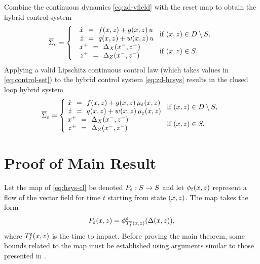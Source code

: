 Combine the continuous dynamics \eqref{eq:zd-vfield} with the reset map to obtain the hybrid control system
%
\begin{align}
  \label{eq:zd-hcsys}
  \HCSbar= \left\{
  \begin{array}{l l}
    \begin{array}{r c l}
      {\dot \zdx} &\!\!=\!\!& f\argsxz + g\argsxz \, u\\
      {\dot \zdz} &\!\!=\!\!& q\argsxz + w\argsxz \, u
    \end{array} \!\! & \!\! \mbox{if } \argsxz \in \D \setminus \S,\\
    \begin{array}{r c l}
      \zdx^{+} &\!\!=\!\!& \DeltaX(\zdx^{-}, \zdz^{-})\\
      \zdz^{+} &\!\!=\!\!& \DeltaZ(\zdx^{-}, \zdz^{-})
    \end{array} \!\! & \!\! \mbox{if } \argsxz \in \S.
  \end{array}\right.
\end{align}
%
Applying a valid Lipschitz continuous control law (which takes values in \eqref{eq:control-set}) to the hybrid control system \eqref{eq:zd-hcsys} results in the closed loop hybrid system
%
\begin{align}
  \label{eq:zd-hsys-cl}
  \HSbar_{\resclfparam} = \left\{\!\!\!\!
  \begin{array}{l l}
    \begin{array}{r c l}
      {\dot \zdx} &\!\!=\!\!& f\argsxz + g\argsxz \, \mueps\argsxz\\
      {\dot \zdz} &\!\!=\!\!& q\argsxz + w\argsxz \, \mueps\argsxz
    \end{array} \!\! & \!\! \mbox{if } \argsxz \in \D \setminus \S,\\
    \begin{array}{r c l}
      \zdx^{+} &\!\!=\!\!& \DeltaX(\zdx^{-}, \zdz^{-})\\
      \zdz^{+} &\!\!=\!\!& \DeltaZ(\zdx^{-}, \zdz^{-})
    \end{array} \!\! & \!\! \mbox{if } \argsxz \in \S.
  \end{array}\right.
\end{align}

\section{Proof of Main Result} \label{sec:proof}

Let the \Poincare{} map of \eqref{eq:hsys-cl} be denoted $P_{\varepsilon} : S \to S$ and let $\phi_{t}(x, z)$ represent a flow of the vector field for time $t$ starting from state $(x, z)$.
%
The \Poincare{} map takes the form
%
\begin{align}
  \label{eq:poincare}
  P_{\varepsilon}(x, z) = \phi^{\varepsilon}_{T_{I}^{\varepsilon}(x, z)}(\Delta(x, z)),
\end{align}
%
where $T_{I}^{\varepsilon}(x, z)$ is the time to impact.
%
Before proving the main theorem, some bounds related to the \Poincare{} map must be established using arguments similar to those presented in \cite{AmGaSrGr14,MoGr05}.

